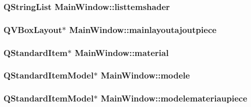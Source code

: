 \hypertarget{class_main_window_a889162c5299f284129bec68a0cc45cbf}{
\subsubsection[{listtemshader}]{\setlength{\rightskip}{0pt plus 5cm}Q\+String\+List Main\+Window\+::listtemshader\hspace{0.3cm}{\ttfamily [private]}}}\label{class_main_window_a889162c5299f284129bec68a0cc45cbf}
\hypertarget{class_main_window_a9c7efc08e16b1648f53664b98dc99c00}{
\subsubsection[{mainlayoutajoutpiece}]{\setlength{\rightskip}{0pt plus 5cm}Q\+V\+Box\+Layout$\ast$ Main\+Window\+::mainlayoutajoutpiece\hspace{0.3cm}{\ttfamily [private]}}}\label{class_main_window_a9c7efc08e16b1648f53664b98dc99c00}
\hypertarget{class_main_window_ad89e3c0f75025021cddb58c4cdd5edd8}{
\subsubsection[{material}]{\setlength{\rightskip}{0pt plus 5cm}Q\+Standard\+Item$\ast$ Main\+Window\+::material\hspace{0.3cm}{\ttfamily [private]}}}\label{class_main_window_ad89e3c0f75025021cddb58c4cdd5edd8}
\hypertarget{class_main_window_abb752b382e336483740c8e0ad21cbcf5}{
\subsubsection[{modele}]{\setlength{\rightskip}{0pt plus 5cm}Q\+Standard\+Item\+Model$\ast$ Main\+Window\+::modele\hspace{0.3cm}{\ttfamily [private]}}}\label{class_main_window_abb752b382e336483740c8e0ad21cbcf5}
\hypertarget{class_main_window_a7bdcda1e4a341f69651631c5ee882c41}{
\subsubsection[{modelemateriaupiece}]{\setlength{\rightskip}{0pt plus 5cm}Q\+Standard\+Item\+Model$\ast$ Main\+Window\+::modelemateriaupiece\hspace{0.3cm}{\ttfamily [private]}}}\label{class_main_window_a7bdcda1e4a341f69651631c5ee882c41}
